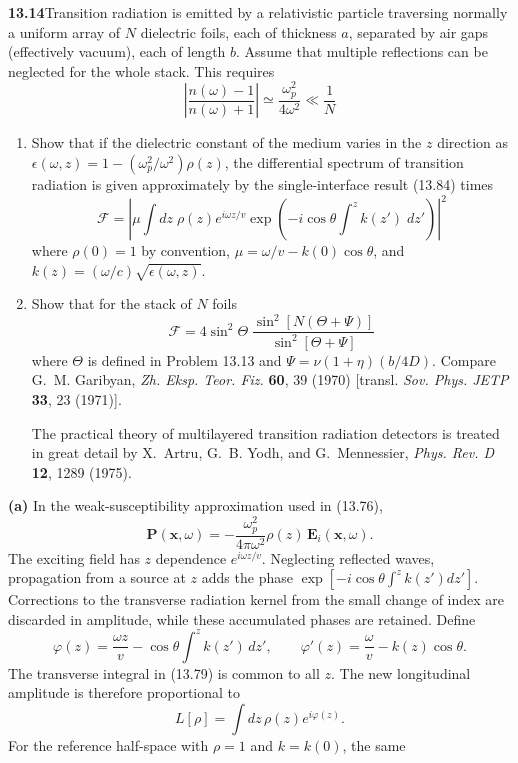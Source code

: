 \par\bigskip
\noindent\textbf{13.14}\quad Transition radiation is emitted by a relativistic particle traversing normally a uniform array of $N$ dielectric foils, each of thickness $a$, separated by air gaps (effectively vacuum), each of length $b$. Assume that multiple reflections can be neglected for the whole stack. This requires
\[
\left|\frac{n(\omega)-1}{n(\omega)+1}\right|\simeq\frac{\omega_{p}^{2}}{4\omega^{2}}\ll\frac{1}{N}
\]
\begin{enumerate}
\item[(a)] Show that if the dielectric constant of the medium varies in the $z$ direction as $\epsilon(\omega,z)=1-(\omega_{p}^{2}/\omega^{2})\rho(z)$, the differential spectrum of transition radiation is given approximately by the single-interface result (13.84) times
\[
\mathcal{F}=\left|\mu\int dz\;\rho(z)e^{i\omega z/v}\exp\!\left(-i\cos\theta\int^{z}k(z')\;dz'\right)\right|^{2}
\]
where $\rho(0)=1$ by convention, $\mu=\omega/v-k(0)\cos\theta$, and $k(z)=(\omega/c)\sqrt{\epsilon(\omega,z)}$.
\item[(b)] Show that for the stack of $N$ foils
\[
\mathcal{F}=4\sin^{2}\Theta\;\frac{\sin^{2}[N(\Theta+\Psi)]}{\sin^{2}[\Theta+\Psi]}
\]
where $\Theta$ is defined in Problem 13.13 and $\Psi=\nu(1+\eta)(b/4D)$. Compare G.~M. Garibyan, \emph{Zh. Eksp. Teor. Fiz.} \textbf{60}, 39 (1970) [transl. \emph{Sov. Phys. JETP} \textbf{33}, 23 (1971)].

The practical theory of multilayered transition radiation detectors is treated in great detail by X.~Artru, G.~B. Yodh, and G.~Mennessier, \emph{Phys. Rev. D} \textbf{12}, 1289 (1975).
\end{enumerate}
\solution
\textbf{(a)} In the weak-susceptibility approximation used in (13.76),
\[
 \mathbf P(\mathbf x,\omega)
 =-\frac{\omega_p^2}{4\pi\omega^2}\rho(z)\,
      \mathbf E_i(\mathbf x,\omega).
\]
The exciting field has $z$ dependence $e^{i\omega z/v}$.
Neglecting reflected waves, propagation from a source at $z$ adds the
phase $\exp[-i\cos\theta\int^z k(z')dz']$. Corrections to the
transverse radiation kernel from the small change of index are
discarded in amplitude, while these accumulated phases are retained.
Define
\[
 \varphi(z)=\frac{\omega z}{v}-\cos\theta\int^z k(z')\,dz',
 \qquad
 \varphi'(z)=\frac{\omega}{v}-k(z)\cos\theta.
\]
The transverse integral in (13.79) is common to all $z$. The new
longitudinal amplitude is therefore proportional to
\[
 L[\rho]=\int dz\,\rho(z)e^{i\varphi(z)}.
\]
For the reference half-space with $\rho=1$ and $k=k(0)$, the same
